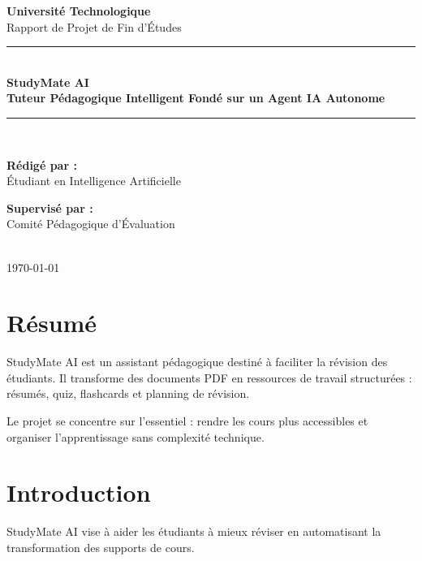 ﻿\documentclass[12pt,a4paper]{report}
\begin{document}
\begin{titlepage}
    \centering
    \vspace*{1.5cm}
    {\huge\bfseries Université Technologique}\\[0.5cm]
    {\large Rapport de Projet de Fin d'Études}\\[1.5cm]
    
    \rule{\linewidth}{0.5mm}\\[0.4cm]
    {\Huge \bfseries StudyMate AI}\\[0.2cm]
    {\large \bfseries Tuteur Pédagogique Intelligent Fondé sur un Agent IA Autonome}\\[0.4cm]
    \rule{\linewidth}{0.5mm}\\[1.5cm]
    
    \noindent
    \begin{minipage}[t]{0.45\linewidth}
        \textbf{Rédigé par :}\\
        Étudiant en Intelligence Artificielle
    \end{minipage}
    \hfill
    \begin{minipage}[t]{0.45\linewidth}
        \textbf{Supervisé par :}\\
        Comité Pédagogique d'Évaluation
    \end{minipage}\\[3cm]
    
    {\large \today}
    \vfill
\end{titlepage}

\tableofcontents
\newpage

\chapter*{Résumé}
StudyMate AI est un assistant pédagogique destiné à faciliter la révision des étudiants. Il transforme des documents PDF en ressources de travail structurées : résumés, quiz, flashcards et planning de révision.

Le projet se concentre sur l'essentiel : rendre les cours plus accessibles et organiser l'apprentissage sans complexité technique.
\newpage

\chapter{Introduction}
StudyMate AI vise à aider les étudiants à mieux réviser en automatisant la transformation des supports de cours.
\end{document}
